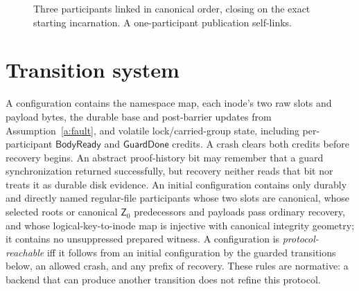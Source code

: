 \documentclass[10pt,twocolumn]{article}
\theoremstyle{remark}
\newcommand{\Prepared}{\mathsf{B}}
\newcommand{\Zero}{\mathsf{Z}}
\newcommand{\inc}{\iota}
\begin{document}
\begin{figure}[t]
\centering
{}
\caption{Three participants linked in canonical order, closing on the exact starting incarnation.
A one-participant publication self-links.}
\label{fig:ring}
\end{figure}

\section{Transition system}\label{sec:transitions}

A configuration contains the namespace map, each inode's two raw slots and payload bytes, the
durable base and post-barrier updates from Assumption~\ref{a:fault}, and volatile lock/carried-group
state, including per-participant $\mathsf{BodyReady}$ and $\mathsf{GuardDone}$ credits. A crash
clears both credits before recovery begins. An abstract proof-history bit may remember that a
guard synchronization returned successfully, but recovery neither reads that bit nor treats it as
durable disk evidence. An initial configuration contains only durably and
directly named regular-file participants whose two slots are
canonical, whose selected roots or canonical $\Zero_0$ predecessors and payloads pass ordinary
recovery, and whose logical-key-to-inode map is injective with canonical integrity geometry; it
contains no unsuppressed prepared witness. A configuration is
\emph{protocol-reachable} iff it follows from an initial configuration by the guarded transitions
below, an allowed crash, and any prefix of recovery. These rules are normative: a backend that can
produce another transition does not refine this protocol.
\end{document}
